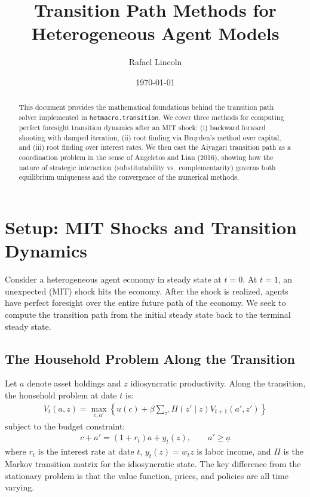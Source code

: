\documentclass[12pt]{article}
\title{Transition Path Methods for Heterogeneous Agent Models}
\author{Rafael Lincoln}
\date{\today}
\begin{document}
\maketitle

\begin{abstract}
This document provides the mathematical foundations behind the transition path solver implemented in \texttt{hetmacro.transition}. We cover three methods for computing perfect foresight transition dynamics after an MIT shock: (i) backward forward shooting with damped iteration, (ii) root finding via Broyden's method over capital, and (iii) root finding over interest rates. We then cast the Aiyagari transition path as a coordination problem in the sense of Angeletos and Lian (2016), showing how the nature of strategic interaction (substitutability vs.\ complementarity) governs both equilibrium uniqueness and the convergence of the numerical methods.
\end{abstract}

\tableofcontents

\newpage

\section{Setup: MIT Shocks and Transition Dynamics}

Consider a heterogeneous agent economy in steady state at $t = 0$. At $t = 1$, an unexpected (MIT) shock hits the economy. After the shock is realized, agents have perfect foresight over the entire future path of the economy. We seek to compute the transition path from the initial steady state back to the terminal steady state.

\subsection{The Household Problem Along the Transition}

Let $a$ denote asset holdings and $z$ idiosyncratic productivity. Along the transition, the household problem at date $t$ is:
\begin{align}
    V_t(a, z) = \max_{c, a'} \left\{ u(c) + \beta \sum_{z'} \Pi(z' \mid z) V_{t+1}(a', z') \right\} \label{eq:bellman_t}
\end{align}
subject to the budget constraint:
\begin{align}
    c + a' = (1 + r_t) a + y_t(z), \qquad a' \geq \underline{a} \label{eq:budget_t}
\end{align}
where $r_t$ is the interest rate at date $t$, $y_t(z) = w_t z$ is labor income, and $\Pi$ is the Markov transition matrix for the idiosyncratic state. The key difference from the stationary problem is that the value function, prices, and policies are all time varying.
\end{document}
